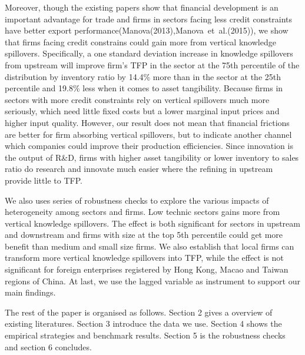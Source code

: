 \documentclass[12pt]{article}%
\begin{document}
\begin{CJK*}{GBK}{fs}
 Moreover, though the existing papers show that financial development is an important advantage for trade and firms in sectors facing less credit constraints have better export performance(\textcolor[rgb]{0.00,0.07,1.00}{Manova(2013)},\textcolor[rgb]{0.00,0.07,1.00}{Manova~et~al.(2015)}), we show that firms facing credit constrains could gain more from vertical knowledge spillovers. Specifically, a one standard deviation increase in knowledge spillovers from upstream will improve firm's TFP in the sector at the 75th percentile of the distribution by inventory ratio by 14.4\% more than in the sector at the 25th percentile and 19.8\% less when it comes to asset tangibility.  Because firms in sectors with more credit constraints rely on vertical spillovers much more seriously, which need little fixed costs but a lower marginal input prices and higher input quality. However, our result does not mean that financial frictions are better for firm absorbing vertical spillovers, but to indicate another channel which companies could improve their production efficiencies. Since innovation is the output of R\&D, firms with higher asset tangibility or lower inventory to sales ratio do research and innovate much easier where the refining in upstream provide little to TFP. \par
 We also uses series of robustness checks to explore the various impacts of heterogeneity among sectors and firms. Low technic sectors gains more from vertical knowledge spillovers. The effect is both significant for sectors in upstream and downstream and firms with size at the top 5th percentile could get more benefit than medium and small size firms.  We also establish that local firms can transform more vertical knowledge spillovers into TFP, while the effect is not significant for foreign enterprises registered by Hong Kong, Macao and Taiwan regions of China. At last, we use the lagged variable as instrument to support our main findings.  \par
The rest of the paper is organised as follows. Section 2 gives a overview of existing literatures. Section 3 introduce the data we use. Section 4 shows the empirical strategies and benchmark results. Section 5 is the robustness checks and section 6 concludes.



\end{CJK*}
\end{document}
